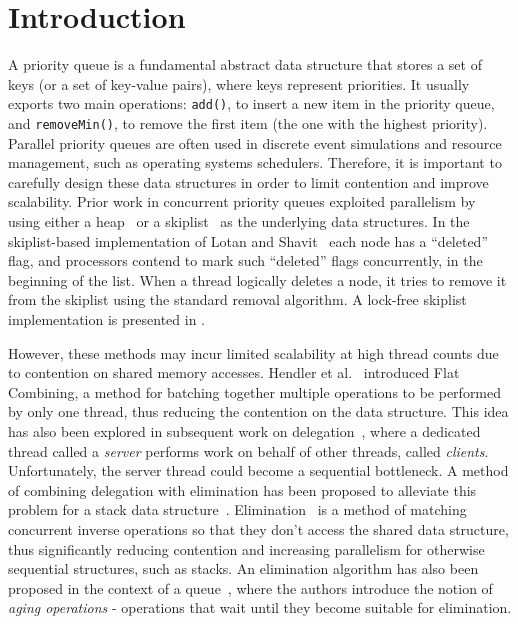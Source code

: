 \section{Introduction}
\label{Sec-Introduction}

A priority queue is a fundamental abstract data structure that stores a set of keys (or a set of key-value pairs), where keys represent priorities. It usually exports two main operations: \texttt{add()}, to insert a new item in the priority queue, and \texttt{removeMin()}, to remove the first item (the one with the highest priority). Parallel priority queues are often used in discrete event simulations and resource management, such as operating systems schedulers. Therefore, it is important to carefully design these data structures in order to limit contention and improve scalability. Prior work in concurrent priority queues exploited parallelism by using either a heap~\cite{pqhunt} or a skiplist~\cite{Lotan2000} as the underlying data structures. In the skiplist-based implementation of Lotan and Shavit~\cite{Lotan2000} each node has a ``deleted'' flag, and processors contend to mark such ``deleted'' flags concurrently, in the beginning of the list. When a thread logically deletes a node, it tries to remove it from the skiplist using the standard removal algorithm. A lock-free skiplist implementation is presented in \cite{pqsundelltsigas}. 

However, these methods may incur limited scalability at high thread counts due to contention on shared memory accesses. Hendler et al.~\cite{Hendler2010} introduced Flat Combining, a method for batching together multiple operations to be performed by only one thread, thus reducing the contention on the data structure. This idea has also been explored in subsequent work on delegation~\cite{Metreveli2012,CalciuDHHKMM13}, where a dedicated thread called a \emph{server} performs work on behalf of other threads, called \emph{clients}. Unfortunately, the server thread could become a sequential bottleneck. A method of combining delegation with elimination has been proposed to alleviate this problem for a stack data structure~\cite{HotPar13Stack}. Elimination~\cite{Hendler2010a} is a method of matching concurrent inverse operations so that they don't access the shared data structure, thus significantly reducing contention and increasing parallelism for otherwise sequential structures, such as stacks. An elimination algorithm has also been proposed in the context of a queue~\cite{Moir2005}, where the authors introduce the notion of \emph{aging operations} - operations that wait until they become suitable for elimination.


